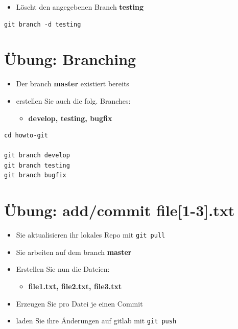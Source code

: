 \documentclass[11pt]{article}
\begin{document}
\begin{itemize}
\item Löscht den angegebenen Branch \textbf{testing}
\end{itemize}
\begin{verbatim}
git branch -d testing
\end{verbatim}


\section{Übung: Branching}
\label{sec:org7f7895e}

\begin{itemize}
\item Der branch \textbf{master} existiert bereits

\item erstellen Sie auch die folg. Branches:
\begin{itemize}
\item \textbf{develop, testing, bugfix}
\end{itemize}
\end{itemize}

\begin{verbatim}
cd howto-git 

git branch develop
git branch testing
git branch bugfix

\end{verbatim}


\section{Übung: add/commit file[1-3].txt}
\label{sec:org8b68f0f}

\begin{itemize}
\item Sie aktualisieren ihr lokales Repo mit \texttt{git pull}

\item Sie arbeiten auf dem branch \textbf{master}

\item Erstellen Sie nun die Dateien:
\begin{itemize}
\item \textbf{file1.txt, file2.txt, file3.txt}
\end{itemize}

\item Erzeugen Sie pro Datei je einen Commit

\item laden Sie ihre Änderungen auf gitlab mit \texttt{git push}
\end{itemize}
\end{document}
